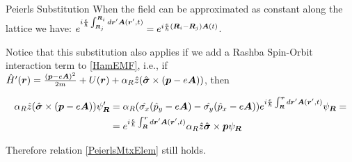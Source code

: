 \begin{subappendices}
\begin{section}{Peierls Substitution}
When the field can be approximated as constant along the lattice we have: $e^{i\frac{e}{\hbar}\int_{\boldsymbol{R}_j}^{\boldsymbol{R}_i} d\boldsymbol{r}'\boldsymbol{A}(\boldsymbol{r}',t)} = e^{i\frac{e}{\hbar} (\boldsymbol{R}_i-\boldsymbol{R}_j) \boldsymbol{A}(t)}$.

Notice that this substitution also applies if we add a Rashba Spin-Orbit interaction term to \ref{HamEMF}, i.e., if $\hat{H}'(\boldsymbol{r}) = \frac{(\boldsymbol{p}-e\boldsymbol{A})^2}{2m} +U(\boldsymbol{r}) + \alpha_R \hat{z}(\hat{\boldsymbol{\sigma}} \times (\boldsymbol{p}-e\boldsymbol{A}))$, then

\begin{align*}
  \alpha_R \hat{z}(\hat{\boldsymbol{\sigma}} \times (\boldsymbol{p}-e\boldsymbol{A})) \psi'_{\boldsymbol{R}} &= \alpha_R(\hat{\sigma_x}(\hat{p}_y-e\boldsymbol{A}) - \hat{\sigma_y}(\hat{p}_x-e\boldsymbol{A})) e^{i\frac{e}{\hbar}\int_{\boldsymbol{R}}^{\boldsymbol{r}}d\boldsymbol{r}'\boldsymbol{A}(\boldsymbol{r}',t)} \psi_{\boldsymbol{R}} = \\
  &= e^{i\frac{e}{\hbar}\int_{\boldsymbol{R}}^{\boldsymbol{r}}d\boldsymbol{r}'\boldsymbol{A}(\boldsymbol{r}',t)} \alpha_R \hat{z}\hat{\boldsymbol{\sigma}} \times \boldsymbol{p} \psi_{\boldsymbol{R}}
\end{align*}

Therefore relation \ref{PeierlsMtxElem} still holds.

\end{section}
\end{subappendices}







